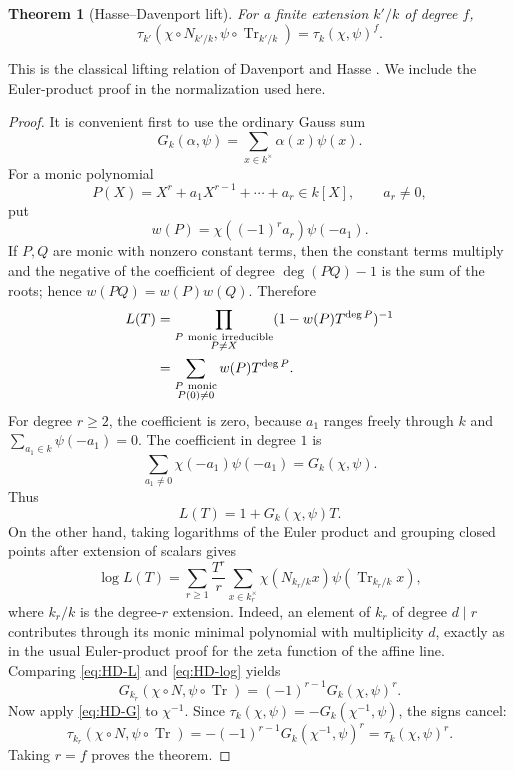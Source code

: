 \documentclass[11pt]{amsart}
\newtheorem{theorem}{Theorem}[section]
\theoremstyle{definition}
\theoremstyle{remark}
\newcommand{\Tr}{\operatorname{Tr}}
\begin{document}
\begin{theorem}[Hasse--Davenport lift]\label{thm:HD-lift}
For a finite extension $k'/k$ of degree $f$,
\begin{equation}\label{eq:HD-lift}
 \tau_{k'}(\chi\circ N_{k'/k},\psi\circ\Tr_{k'/k})
 =\tau_k(\chi,\psi)^f.
\end{equation}
\end{theorem}

This is the classical lifting relation of Davenport and Hasse
\cite{DavenportHasse}.  We include the Euler-product proof in the
normalization used here.

\begin{proof}
It is convenient first to use the ordinary Gauss sum
\[
 G_k(\alpha,\psi)=\sum_{x\in k^\times}\alpha(x)\psi(x).
\]
For a monic polynomial
\[
 P(X)=X^r+a_1X^{r-1}+\cdots+a_r\in k[X],\qquad a_r\ne0,
\]
put
\[
 w(P)=\chi((-1)^r a_r)\psi(-a_1).
\]
If $P,Q$ are monic with nonzero constant terms, then the constant terms
multiply and the negative of the coefficient of degree
$\deg(PQ)-1$ is the sum of the roots; hence $w(PQ)=w(P)w(Q)$.  Therefore
\begin{align*}
 L(T)
 &=\prod_{\substack{P\ {\rm monic\ irreducible}\\ P\ne X}}
       (1-w(P)T^{\deg P})^{-1}\\
 &=\sum_{\substack{P\ {\rm monic}\\ P(0)\ne0}}w(P)T^{\deg P}.
\end{align*}
For degree $r\ge2$, the coefficient is zero, because $a_1$ ranges freely
through $k$ and $\sum_{a_1\in k}\psi(-a_1)=0$.  The coefficient in
degree $1$ is
\[
 \sum_{a_1\ne0}\chi(-a_1)\psi(-a_1)=G_k(\chi,\psi).
\]
Thus
\begin{equation}\label{eq:HD-L}
 L(T)=1+G_k(\chi,\psi)T.
\end{equation}
On the other hand, taking logarithms of the Euler product and grouping
closed points after extension of scalars gives
\begin{equation}\label{eq:HD-log}
 \log L(T)=\sum_{r\ge1}\frac{T^r}{r}
 \sum_{x\in k_r^\times}
     \chi(N_{k_r/k}x)\psi(\Tr_{k_r/k}x),
\end{equation}
where $k_r/k$ is the degree-$r$ extension.  Indeed, an element of $k_r$
of degree $d\mid r$ contributes through its monic minimal polynomial
with multiplicity $d$, exactly as in the usual Euler-product proof for
the zeta function of the affine line.  Comparing \eqref{eq:HD-L} and
\eqref{eq:HD-log} yields
\begin{equation}\label{eq:HD-G}
 G_{k_r}(\chi\circ N,\psi\circ\Tr)
 =(-1)^{r-1}G_k(\chi,\psi)^r.
\end{equation}
Now apply \eqref{eq:HD-G} to $\chi^{-1}$.  Since
$\tau_k(\chi,\psi)=-G_k(\chi^{-1},\psi)$, the signs cancel:
\[
 \tau_{k_r}(\chi\circ N,\psi\circ\Tr)
 =-(-1)^{r-1}G_k(\chi^{-1},\psi)^r
 =\tau_k(\chi,\psi)^r.
\]
Taking $r=f$ proves the theorem.
\end{proof}
\end{document}
